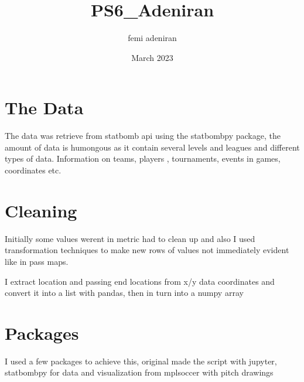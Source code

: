\documentclass{article}
\title{PS6_Adeniran}
\author{femi adeniran}
\date{March 2023}
\begin{document}
\maketitle

\section{The Data }
The data was retrieve from statbomb api using the statbombpy package, the amount of data is humongous as it contain several levels and leagues and different types of data. Information on teams, players , tournaments, events in games, coordinates etc.
\section{ Cleaning }
Initially some values werent in metric had to clean up and also I used transformation techniques to make new rows of values not immediately evident like in pass maps. 

I extract location and passing end locations from x/y data coordinates and convert it into a list with pandas, then in turn into a numpy array
\section{ Packages}

I used a few packages to achieve this, original made the script with jupyter, statbombpy for data  and visualization from mplsoccer with pitch drawings
\end{document}

